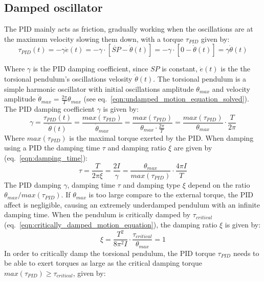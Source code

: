\documentclass[\main/master.tex]{subfiles}
\begin{document}
\subsection{Damped oscillator}
The PID mainly acts as friction, gradually working when the oscillations are at the maximum velocity slowing them down, with a torque $\tau_{PID}$ given by:
\begin{equation}
\tau_{PID}(t) = -\gamma\dot{e}(t) =  -\gamma\cdot [\dot{SP} -\dot{\theta}(t)] =-\gamma\cdot [0-\dot{\theta}(t)]  =  \gamma\dot{\theta}(t)  
\label{eqn:friction_torque_pid}
\end{equation}
\par\noindent
Where $\gamma$ is the PID damping coefficient, since $SP$ is constant, $\dot{e}(t)$ is the the torsional pendulum's oscillations velosity $\dot{\theta}(t)$. The torsional pendulum is a simple harmonic oscillator with initial oscillations amplitude $\theta_{max}$ and velocity amplitude $\dot{\theta}_{max} =\frac{2\pi}{T} \theta_{max}$ (see eq.~\ref{eqn:undamped_motion_equation_solved}). The PID damping coefficient $\gamma$ is given by:
\begin{equation}
\gamma  =  \frac{\tau_{PID}(t)}{\dot{\theta}(t)} = \frac{max(\tau_{PID})}{\dot{\theta}_{max}} =  \frac{max(\tau_{PID})}{\theta_{max}\cdot\frac{2\pi}{T}} =\frac{max(\tau_{PID})}{\theta_{max}}\cdot \frac{ T}{2\pi}          \label{eqn:damped_pid_motion_equation_2}
\end{equation}
Where $max(\tau_{PID})$ is the maximal torque exerted by the PID. When damping using a PID the damping time $\tau$ and damping ratio $\xi$ are given by (eq.~\ref{eqn:damping_time}):
\begin{equation}
\tau = \frac{T}{2 \pi \xi } =  \frac{2I}{\gamma} = \frac{\theta_{max}}{ max(\tau_{PID})} \cdot \frac{4\pi I}{T}  \label{eqn:damping_time_pid}
\end{equation}
The PID damping $\gamma$, damping time $\tau$ and damping type $\xi$ depend on the ratio $\theta_{max}/max(\tau_{PID})$. If $\theta_{max}$ is too large compare to the external torque, the PID affect is negligible, causing an extremely underdamped pendulum with an infinite damping time. When the pendulum is critically damped  by $\tau_{critical}$ (eq.~\ref{eqn:critically_damped_motion_equation}), the damping ratio $\xi$ is given by:
\begin{equation}
\xi = \frac{T^2}{ 8 \pi^2 I }\cdot\frac{ \tau_{critical}}{\theta_{max}} = 1 
\label{eqn:damping_ratio_pid}
\end{equation}
In order to critically damp the torsional pendulum, the PID torque $\tau_{PID}$ needs to be able to exert torques as large as the critical damping torque $max(\tau_{PID}) \geq  \tau_{critical}$, given by:
\end{document}
